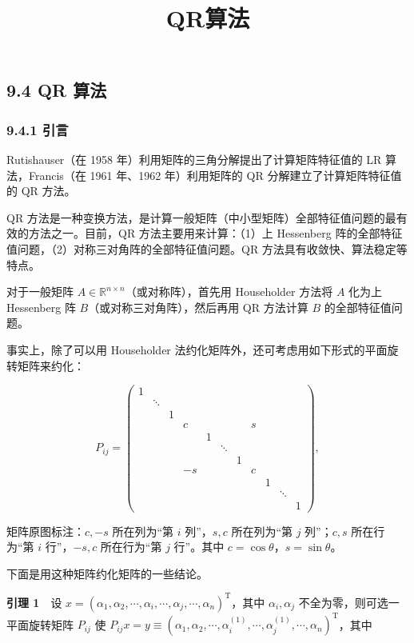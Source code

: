 \documentclass[
  10pt,
  fontset=fandol]{ctexart}
\title{QR算法}
\author{}
\date{}
\begin{document}
\maketitle

\subsection{9.4 QR 算法}\label{qr-ux7b97ux6cd5}

\subsubsection{9.4.1 引言}\label{ux5f15ux8a00}

Rutishauser（在 1958 年）利用矩阵的三角分解提出了计算矩阵特征值的 LR 算法，Francis（在 1961 年、1962 年）利用矩阵的 QR 分解建立了计算矩阵特征值的 QR 方法。

QR 方法是一种变换方法，是计算一般矩阵（中小型矩阵）全部特征值问题的最有效的方法之一。目前，QR 方法主要用来计算：（1）上 Hessenberg 阵的全部特征值问题，（2）对称三对角阵的全部特征值问题。QR 方法具有收敛快、算法稳定等特点。

对于一般矩阵 \(A\in\mathbb R^{n\times n}\)（或对称阵），首先用 Householder 方法将 \(A\) 化为上 Hessenberg 阵 \(B\)（或对称三对角阵），然后再用 QR 方法计算 \(B\) 的全部特征值问题。

事实上，除了可以用 Householder 法约化矩阵外，还可考虑用如下形式的平面旋转矩阵来约化：

\[
P_{ij}=\left(\begin{array}{*{11}{c}}
1&&&&&&&&&&\\
&\ddots&&&&&&&&&\\
&&1&&&&&&&&\\
&&&c&&&&s&&&\\
&&&&1&&&&&&\\
&&&&&\ddots&&&&&\\
&&&&&&1&&&&\\
&&&-s&&&&c&&&\\
&&&&&&&&1&&\\
&&&&&&&&&\ddots&\\
&&&&&&&&&&1
\end{array}\right),
\tag{9.4.1}
\]

矩阵原图标注：\(c,-s\) 所在列为``第 \(i\) 列''，\(s,c\) 所在列为``第 \(j\) 列''；\(c,s\) 所在行为``第 \(i\) 行''，\(-s,c\) 所在行为``第 \(j\) 行''。其中 \(c=\cos\theta\)，\(s=\sin\theta\)。

下面是用这种矩阵约化矩阵的一些结论。

\textbf{引理 1}　设 \(x=(\alpha_1,\allowbreak \alpha_2,\allowbreak \cdots,\allowbreak \alpha_i,\allowbreak \cdots,\allowbreak \alpha_j,\allowbreak \cdots,\allowbreak \alpha_n)^{\mathrm T}\)，其中 \(\alpha_i,\alpha_j\) 不全为零，则可选一平面旋转矩阵 \(P_{ij}\) 使 \(P_{ij}x=y\equiv(\alpha_1,\allowbreak \alpha_2,\allowbreak \cdots,\allowbreak \alpha_i^{(1)},\allowbreak \cdots,\allowbreak \alpha_j^{(1)},\allowbreak \cdots,\allowbreak \alpha_n)^{\mathrm T}\)，其中
\end{document}
